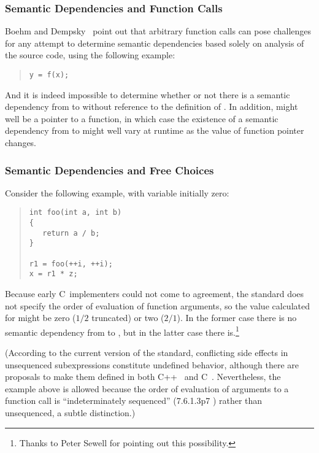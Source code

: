 \subsubsection{Semantic Dependencies and Function Calls}
\label{sec:Semantic Dependencies and Function Calls}

Boehm and Dempsky~\cite[Section 5]{Boehm:2014:OGA:2618128.2618134}
point out that arbitrary function calls can pose challenges for any
attempt to determine semantic dependencies based solely on analysis
of the source code, using the following example:
\begin{quote}
\begin{verbatim}
y = f(x);
\end{verbatim}
\end{quote}
And it is indeed impossible to determine whether or not there is a
semantic dependency from  to  without reference to the
definition of .
In addition,  might well be a pointer to a function, in which case
the existence of a semantic dependency from  to  might well
vary at runtime as the value of function pointer  changes.

\subsubsection{Semantic Dependencies and Free Choices}
\label{sec:Semantic Dependencies and Free Choices}

Consider the following example, with variable  initially zero:
\begin{quote}
\begin{verbatim}
int foo(int a, int b)
{
   return a / b;
}

r1 = foo(++i, ++i);
x = r1 * z;
\end{verbatim}
\end{quote}
Because early C~implementers could not come to agreement, the standard
does not specify the order of evaluation of function arguments, so
the value calculated for  might be zero ($1/2$ truncated) or two
($2/1$).
In the former case there is no semantic dependency from  to ,
but in the latter case there is.\footnote{
	Thanks to Peter Sewell for pointing out this possibility.}

(According to the current version of the standard, conflicting side effects
in unsequenced subexpressions constitute undefined behavior,
although there are proposals to make them defined in both
C++~\cite{GabrielDosReis2016P0145r3}
and C~\cite{AlexCeleste2023N3203}.
Nevertheless, the example above is allowed because the order of evaluation
of arguments to a function call is ``indeterminately sequenced''
(7.6.1.3p7 ) rather than unsequenced, a subtle distinction.)


